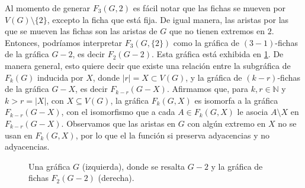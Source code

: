 Al momento de generar $F_3(G,2)$ es f\'acil notar que las fichas se mueven por
$V(G) \setminus \{2\}$, excepto la ficha que est\'a fija. De igual manera, las
aristas por las que se mueven las fichas son las aristas de $G$ que no tienen
extremos en $2$. Entonces, podr\'iamos interpretar $F_3(G,\{2\})$ como la
gr\'afica de $(3-1)$-fichas de la gr\'afica $G-2$, es decir $F_2(G-2)$. Esta
gr\'afica est\'a exhibida en \cref{fig:ex-tok-subgraph-aux}. De manera general,
esto quiere decir que existe una relaci\'on entre la subgr\'afica de $F_k(G)$
inducida por $X$, donde $|r|=X \subset V(G)$, y la gr\'afica de $(k-r)$-fichas
de la gr\'afica $G-X$, es decir $F_{k-r}(G-X)$. Afirmamos que, para $k,r \in
\mathbb{N}$ y $k>r = |X|$, con $X \subseteq V(G)$, la gr\'afica $F_k(G,X)$ es
isomorfa a la gr\'afica $F_{k-r}(G-X)$, con el isomorfismo que a cada $A \in
F_k(G,X)$ le asocia $A \setminus X$ en $F_{k-r}(G-X)$.   Observamos que las
aristas en $G$ con alg\'un extremo en $X$ no se usan en $F_k(G,X)$, por lo que
el la funci\'on si preserva adyacencias y no adyacencias.

\begin{figure}[ht!]
    \centering
    \caption{Una gr\'afica $G$ (izquierda), donde se resalta $G-2$ y la 
    gr\'afica de fichas $F_2(G-2)$ (derecha).}
    \label{fig:ex-tok-subgraph-aux}
\end{figure}

